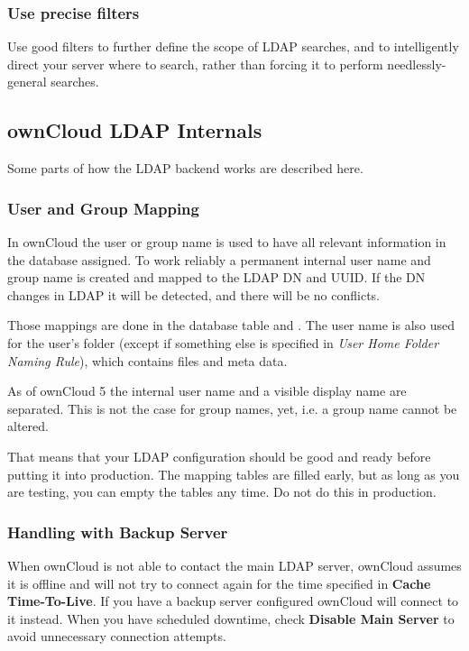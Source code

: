 \documentclass[letterpaper,10pt,english]{sphinxmanual}
\begin{document}
\subsubsection{Use precise filters}
\label{configuration_user/user_auth_ldap:use-precise-filters}
Use good filters to further define the scope of LDAP searches, and to intelligently direct your server where to search, rather than forcing it to perform needlessly-general searches.


\subsection{ownCloud LDAP Internals}
\label{configuration_user/user_auth_ldap:owncloud-ldap-internals}
Some parts of how the LDAP backend works are described here.


\subsubsection{User and Group Mapping}
\label{configuration_user/user_auth_ldap:user-and-group-mapping}
In ownCloud the user or group name is used to have all relevant information in
the database assigned. To work reliably a permanent internal user name and
group name is created and mapped to the LDAP DN and UUID. If the DN changes in
LDAP it will be detected, and there will be no conflicts.

Those mappings are done in the database table  and
. The user name is also used for the user's folder (except
if something else is specified in \emph{User Home Folder Naming Rule}), which
contains files and meta data.

As of ownCloud 5 the internal user name and a visible display name are separated.
This is not the case for group names, yet, i.e. a group name cannot be altered.

That means that your LDAP configuration should be good and ready before putting
it into production. The mapping tables are filled early, but as long as you are
testing, you can empty the tables any time. Do not do this in production.


\subsubsection{Handling with Backup Server}
\label{configuration_user/user_auth_ldap:handling-with-backup-server}
When ownCloud is not able to contact the main LDAP server, ownCloud assumes it
is offline and will not try to connect again for the time specified in \textbf{Cache
Time-To-Live}. If you have a backup server configured ownCloud will connect to
it instead. When you have scheduled downtime, check \textbf{Disable Main Server}  to
avoid unnecessary connection attempts.
\end{document}
